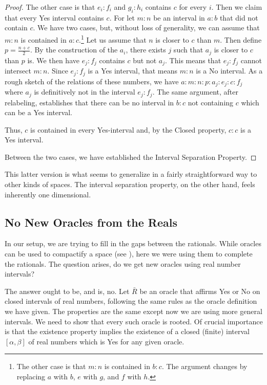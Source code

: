 \documentclass[12pt]{article}
\begin{document}
\begin{proof}
    The other case is that $e_i:f_i$ and $g_i:h_i$ contains $c$ for every $i$. Then we claim that every Yes interval contains $c$. For let $m:n$ be an interval in $a:b$ that did not contain $c$. We have two cases, but, without loss of generality, we can assume that $m:n$ is contained in $a:c$.\footnote{The other case is that $m:n$ is contained in $b:c$. The argument changes by replacing $a$ with $b$, $e$ with $g$, and $f$ with $h$.} Let us assume that $n$ is closer to $c$ than $m$. Then define $p =\frac{n+c}{2}$. By the construction of the $a_i$, there exists $j$ such that $a_j$ is closer to $c$ than $p$ is. We then have $e_j:f_j$ contains $c$ but not $a_j$. This means that $e_j:f_j$ cannot intersect $m:n$. Since $e_j:f_j$ is a Yes interval, that means $m:n$ is a No interval. As a rough sketch of the relations of these numbers, we have $a:m:n:p:a_j:e_j:c:f_j$ where $a_j$ is definitively not in the interval $e_j:f_j$. The same argument, after relabeling, establishes that there can be no interval in $b:c$ not containing $c$ which can be a Yes interval. 

    Thus, $c$ is contained in every Yes-interval and, by the Closed property, $c:c$ is a Yes interval. 

    Between the two cases, we have established the Interval Separation Property. 
\end{proof}

This latter version is what seems to generalize in a fairly straightforward way to other kinds of spaces. The interval separation property, on the other hand, feels inherently one dimensional. 


\subsection{No New Oracles from the Reals}

In our setup, we are trying to fill in the gaps between the rationals. While oracles can be used to compactify a space (see \cite{taylor23metric} ),  here we were using them to complete the rationals. The question arises, do we get new oracles using real number intervals? 

The answer ought to be, and is, no. Let $\bar{R}$ be an oracle that affirms Yes or No on closed intervals of real numbers, following the same rules as the oracle definition we have given. The properties are the same except now we are using more general intervals. We need to show that every such oracle is rooted. Of crucial importance is that the existence property implies the existence of a closed (finite) interval $[\alpha, \beta]$ of real numbers which is Yes for any given oracle. 
\end{document}
